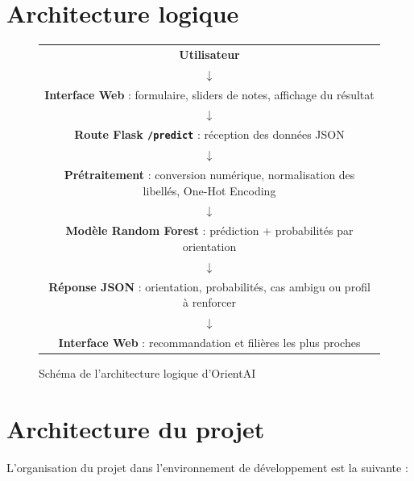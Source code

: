 \documentclass[12pt,a4paper]{report}
\begin{document}
\section{Architecture logique}
\begin{figure}[H]
\centering
\begin{tcolorbox}[colback=white,colframe=mainblue,width=0.95\textwidth]
\centering
\renewcommand{\arraystretch}{1.5}
\begin{tabular}{c}
\textbf{Utilisateur} \\
$\downarrow$ \\
\textbf{Interface Web} : formulaire, sliders de notes, affichage du résultat \\
$\downarrow$ \\
\textbf{Route Flask \texttt{/predict}} : réception des données JSON \\
$\downarrow$ \\
\textbf{Prétraitement} : conversion numérique, normalisation des libellés, One-Hot Encoding \\
$\downarrow$ \\
\textbf{Modèle Random Forest} : prédiction + probabilités par orientation \\
$\downarrow$ \\
\textbf{Réponse JSON} : orientation, probabilités, cas ambigu ou profil à renforcer \\
$\downarrow$ \\
\textbf{Interface Web} : recommandation et filières les plus proches
\end{tabular}
\end{tcolorbox}
\caption{Schéma de l'architecture logique d'OrientAI}
\end{figure}

\section{Architecture du projet}
L'organisation du projet dans l'environnement de développement est la suivante :
\end{document}
